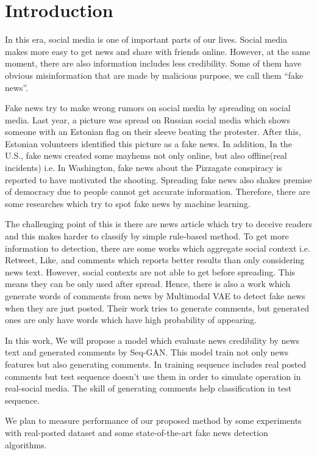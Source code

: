 \section{Introduction}
In this era, social media is one of important parts of our lives.
Social media makes more easy to get news and share with friends online.
However, at the same moment, 
there are also information includes less credibility.
Some of them have obvious misinformation that are made by malicious purpose,
we call them ``fake news''.

Fake news try to make wrong rumors on social media by spreading on social media.
Last year, a picture was spread on Russian social media which shows someone with an Estonian flag on their sleeve beating the protester.
After this, Estonian volunteers identified this picture as a fake news\cite{vaikmaa_2019}.
In addition, In the U.S., fake news created some mayhems not only online, but also offline(real incidents)
i.e. In Washington, fake news about the Pizzagate conspiracy is reported to have motivated the shooting\cite{agencies_2016}.
Spreading fake news also shakes premise of democracy due to people cannot get accurate information.
Therefore, there are some researches which try to spot fake news by machine learning.

The challenging point of this is there are news article which try to deceive readers
and this makes harder to classify by simple rule-based method.
To get more information to detection,
there are some works which aggregate social context i.e. Retweet, Like, and comments
which reports better results than only considering news text\cite{Guo:2018:RDH:3269206.3271709}.
However, social contexts are not able to get before spreading.
This means they can be only used after spread.
Hence, there is also a work which generate words of comments from news by Multimodal VAE to detect fake news when they are just posted\cite{Khattar:2019:MMV:3308558.3313552}.
Their work tries to generate comments, but generated ones are only have words which have high probability of appearing.

In this work, We will propose a model which evaluate news credibility by news text and generated comments by Seq-GAN\cite{AAAI1714344}.
This model train not only news features but also generating comments.
In training sequence includes real posted comments but test sequence doesn't use them in order to simulate operation in real-social media.
The skill of generating comments help classification in test sequence.

We plan to measure performance of our proposed method by some experiments with real-posted dataset and some state-of-the-art fake news detection algorithms.
